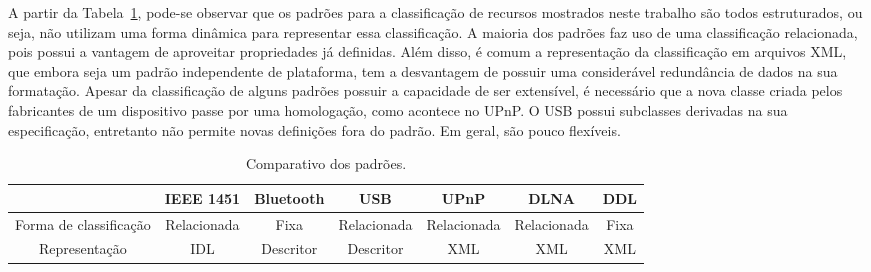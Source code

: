 A partir da Tabela~\ref{tab:comparativo}, pode-se observar que os padrões para a classificação de recursos mostrados neste trabalho são todos estruturados, ou seja, não utilizam uma forma dinâmica para representar essa classificação. A maioria dos padrões faz uso de uma classificação relacionada, pois possui a vantagem de aproveitar propriedades já definidas. Além disso, é comum a representação da classificação em arquivos XML, que embora seja um padrão independente de plataforma, tem a desvantagem de possuir uma considerável redundância de dados na sua formatação. Apesar da classificação de alguns padrões possuir a capacidade de ser extensível, é necessário que a nova classe criada pelos fabricantes de um dispositivo passe por uma homologação, como acontece no UPnP. O USB possui subclasses derivadas na sua especificação, entretanto não permite novas definições fora do padrão. Em geral, são pouco flexíveis. 

\begin{table}
	\caption{Comparativo dos padrões.}
	\begin{center}
	\resizebox{16cm}{!} {
		\begin{tabular}{ccccccc}
		\hline
							& \textbf{IEEE 1451}	& \textbf{Bluetooth} 	& \textbf{USB}	& \textbf{UPnP} & \textbf{DLNA} & \textbf{DDL}\\
		\hline
		Forma de classificação 		& Relacionada 			& Fixa 					& Relacionada 	& Relacionada 	& Relacionada 	& Fixa \\
		\hline
		Representação 		& IDL 					& Descritor				& Descritor		& XML			& XML 			& XML \\ 
		\hline
		\end{tabular}
	}
	\end{center}
	\label{tab:comparativo}
\end{table}

